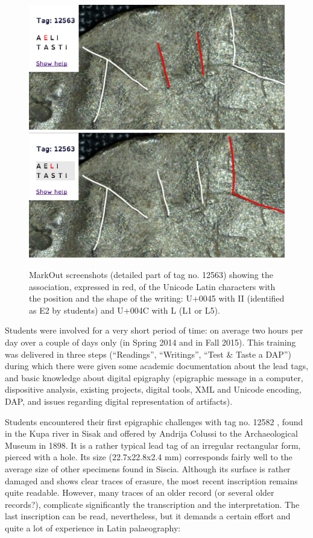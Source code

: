 \documentclass[amsthm,ebook]{saparticle}
\begin{document}
\begin{figure}[!hbp]
\centering
\includegraphics[scale=0.10]{EAGLE16lameetalteaching-img003.png}
\includegraphics[scale=0.10]{EAGLE16lameetalteaching-img004.png}
\caption{MarkOut screenshots (detailed part of tag no. 12563) showing the association, expressed in red, of the Unicode
Latin characters with the position and the shape of the writing: U+0045 with II (identified as E2 by students) and
U+004C with L (L1 or L5).}
\label{fig:markout}
\end{figure}

Students were involved for a very short period of time: on average two hours per day over a couple of days only (in
Spring 2014 and in Fall 2015). This training was delivered in three steps (``Readings'', ``Writings'', ``Test \& Taste a
DAP'') during which there were given some academic documentation about the lead tags, and basic knowledge about digital
epigraphy (epigraphic message in a computer, dispositive analysis, existing projects, digital tools, XML and Unicode
encoding, DAP, and issues regarding digital representation of artifacts).

Students encountered their first epigraphic challenges with tag no. 12582 \citep[cat 03.13, 347]{radman-livaja_plombs_2014}, found in
the Kupa river in Sisak and offered by Andrija Colussi to the Archaeological Museum in 1898. It is a rather typical
lead tag of an irregular rectangular form, pierced with a hole. Its size (22.7x22.8x2.4 mm) corresponds fairly well to
the average size of other specimens found in Siscia. Although its surface is rather damaged and shows clear traces of
erasure, the most recent inscription remains quite readable. However, many traces of an older record (or several older
records?), complicate significantly the transcription and the interpretation. The last inscription can be read,
nevertheless, but it demands a certain effort and quite a lot of experience in Latin palaeography:
\end{document}
